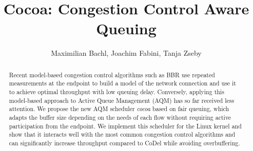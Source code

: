 \documentclass[10pt,sigconf,letterpaper,dvipsnames\ifx\removeHeaders\tempYes ,nonacm\fi]{acmart}
\newcommand{\codel}{CoDel}
\begin{document}
\title{Cocoa: Congestion Control Aware Queuing}



\begin{abstract}
Recent model-based congestion control algorithms such as BBR use repeated measurements at the endpoint to build a model of the network connection and use it to achieve optimal throughput with low queuing delay. Conversely, applying this model-based approach to Active Queue Management (AQM) has so far received less attention. We propose the new AQM scheduler \textit{cocoa} based on fair queuing, which adapts the buffer size depending on the needs of each flow without requiring active participation from the endpoint. We implement this scheduler for the Linux kernel and show that it interacts well with the most common congestion control algorithms and can significantly increase throughput compared to \codel{} while avoiding overbuffering.
\end{abstract}

\author{Maximilian Bachl, Joachim Fabini, Tanja Zseby}



\end{document}
